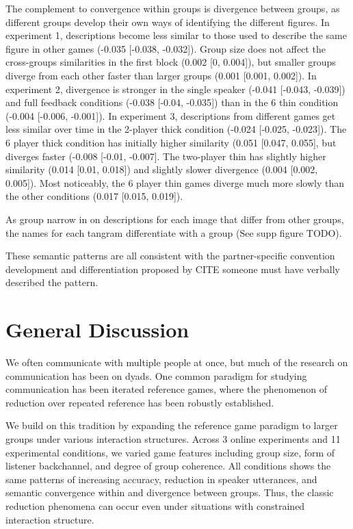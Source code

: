 \documentclass[
  english,
  a4paper,
]{article}
\begin{document}
The complement to convergence within groups is divergence between groups, as different groups develop their own ways of identifying the different figures. In experiment 1, descriptions become less similar to those used to describe the same figure in other games (-0.035 {[}-0.038, -0.032{]}). Group size does not affect the cross-groups similarities in the first block (0.002 {[}0, 0.004{]}), but smaller groups diverge from each other faster than larger groups (0.001 {[}0.001, 0.002{]}). In experiment 2, divergence is stronger in the single speaker (-0.041 {[}-0.043, -0.039{]}) and full feedback conditions (-0.038 {[}-0.04, -0.035{]}) than in the 6 thin condition (-0.004 {[}-0.006, -0.001{]}). In experiment 3, descriptions from different games get less similar over time in the 2-player thick condition (-0.024 {[}-0.025, -0.023{]}). The 6 player thick condition has initially higher similarity (0.051 {[}0.047, 0.055{]}, but diverges faster (-0.008 {[}-0.01, -0.007{]}. The two-player thin has slightly higher similarity (0.014 {[}0.01, 0.018{]}) and slightly slower divergence (0.004 {[}0.002, 0.005{]}). Most noticeably, the 6 player thin games diverge much more slowly than the other conditions (0.017 {[}0.015, 0.019{]}).

As group narrow in on descriptions for each image that differ from other groups, the names for each tangram differentiate with a group (See supp figure TODO).

These semantic patterns are all consistent with the partner-specific convention development and differentiation proposed by CITE someone must have verbally described the pattern.

\hypertarget{general-discussion}{%
\section{General Discussion}\label{general-discussion}}

We often communicate with multiple people at once, but much of the research on communication has been on dyads. One common paradigm for studying communication has been iterated reference games, where the phenomenon of reduction over repeated reference has been robustly established.

We build on this tradition by expanding the reference game paradigm to larger groups under various interaction structures. Across 3 online experiments and 11 experimental conditions, we varied game features including group size, form of listener backchannel, and degree of group coherence. All conditions shows the same patterns of increasing accuracy, reduction in speaker utterances, and semantic convergence within and divergence between groups. Thus, the classic reduction phenomena can occur even under situations with constrained interaction structure.
\end{document}
